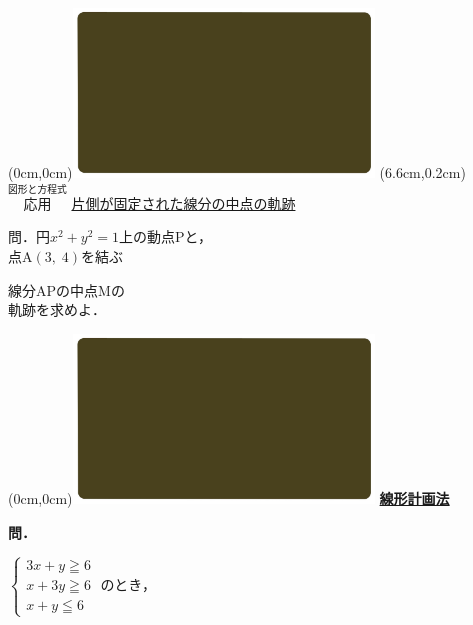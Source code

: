 \documentclass[10pt,
fleqn,
dvipdfmx,
uplatex
]{jsarticle}
\begin{document}
\bf\boldmath

\at(0cm,0cm){\includegraphics[width=8cm,bb=0 0 1920 1080]{./youtube/thumbnails/templates/smart_background/図形と方程式.jpeg}}
\at(6.6cm,0.2cm){\small\color{bradorange}$\overset{\text{図形と方程式}}{\text{応用}}$}
{\color{orange}\Large\underline{片側が固定された線分の中点の軌跡}}\vspace{0.3zw}

\Large 
問．円$x^2+y^2=1$上の動点$\text{P}$と，\\
点$\text{A}\left(3,\;4\right)$を結ぶ

\huge
\hspace{0.5zw}線分APの中点$\text{M}$の\vspace{-0.2zw}\\
\hfill 軌跡を求めよ．

\newpage



\at(0cm,0cm){\includegraphics[width=8cm,bb=0 0 1920 1080]{./youtube/thumbnails/templates/smart_background/図形と方程式.jpeg}}
{\color{orange}\bf\boldmath\huge\underline{線形計画法}}\vspace{0.3zw}

\normalsize
\bf\boldmath 問．

\Large
\vspace{-1zw}
\hspace{1zw}
$\left\{\begin{array}{l}3x+y\geqq 6\;\\x+3y\geqq 6\;\\x+y\leqq 6\end{array}\right.$のとき，
\end{document}
